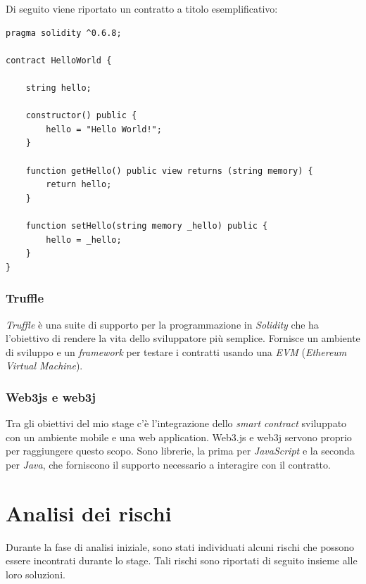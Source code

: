 \newpage
Di seguito viene riportato un contratto a titolo esemplificativo:
\begin{lstlisting}[language = Solidity]
pragma solidity ^0.6.8;

contract HelloWorld {

	string hello;
	
	constructor() public {
	    hello = "Hello World!";
	}

	function getHello() public view returns (string memory) {
		return hello;
	}

	function setHello(string memory _hello) public {
		hello = _hello;
	}
}

\end{lstlisting}

\subsubsection{Truffle}
\textit{Truffle} è una suite di supporto per la programmazione in \textit{Solidity} che ha l'obiettivo di rendere la vita dello sviluppatore più semplice. Fornisce un ambiente di sviluppo e un \textit{framework} per testare i contratti usando una \textit{EVM} (\emph{\gls{Ethereum Virtual Machine}}\glsfirstoccur). 
\subsubsection{Web3js e web3j}
Tra gli obiettivi del mio stage c'è l'integrazione dello \textit{smart contract} sviluppato con un ambiente mobile e una web application. Web3.js e web3j servono proprio per raggiungere questo scopo. Sono librerie, la prima per \textit{JavaScript} e la seconda per \textit{Java}, che forniscono il supporto necessario a interagire con il contratto.


\section{Analisi dei rischi}

Durante la fase di analisi iniziale, sono stati individuati alcuni rischi che possono essere incontrati durante lo stage. Tali rischi sono riportati di seguito insieme alle loro soluzioni.\\

